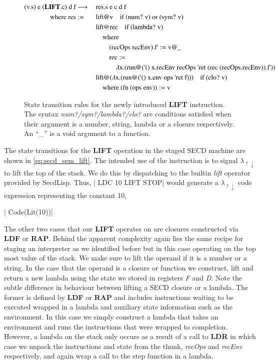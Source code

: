 \documentclass[a4paper,12pt,twoside,openright]{report}
\theoremstyle{definition}
\newcommand{\ts}{\textquotesingle}
\newcommand{\mslang}{$\lambda_{\uparrow\downarrow}$}
\newcommand{\secdlisp}{SecdLisp}
\begin{document}
\begin{figure}[htp!]
\centering
\begin{alignat}{3}
		\text{(v.s) e (} \mathbf{LIFT}\text{.c) d f} & \longrightarrow \: \label{eq:secd_sem_lift}
		 && \text{res.s e c d f}   \\
		 \text{where res} & := && \text{lift@v\quad if (num? v) or (sym? v)} \nonumber \\
		 & && \text{lift@rec} \quad \text{if (lambda? v)} \nonumber \\
		 & && \quad \text{where} \nonumber \\
		 & && \qquad \text{(recOps recEnv).f{\ts}}:= \text{v@\_} \nonumber \\
		 & && \qquad \text{rec} := \nonumber \\
		 & && \quad\qquad\text{$\lambda$x.(run@({\ts}() x.recEnv recOps {\ts}ret (rec (recOps.recEnv)).f{\ts}))} \nonumber \\
		 & && \text{lift@($\lambda$x.(run@({\ts}() x.env ops {\ts}ret f)))} \quad\text{if (clo? v)} \nonumber \\
		 & && \quad \text{where (fn (ops env))}:= \text{v} \nonumber
\end{alignat}
\caption{State transition rules for the newly introduced \textbf{LIFT} instruction. The syntax \textit{num?/sym?/lambda?/clo?} are conditions satisfied when their argument is a number, string, lambda or a closure respectively. An ``\_'' is a void argument to a function.}
\label{fig:secd_lift_sem}
\end{figure}

The state transitions for the \textbf{LIFT} operation in the staged SECD machine are shown in \eqref{eq:secd_sem_lift}. The intended use of the instruction is to signal \mslang{} to lift the top of the stack. We do this by dispatching to the builtin \textit{lift} operator provided by \secdlisp. Thus, |   LDC 10 LIFT STOP| would generate a \mslang{} code expression representing the constant 10,

|    Code(Lit(10))|

The other two cases that our \textbf{LIFT} operates on are closures constructed via \textbf{LDF} or \textbf{RAP}. Behind the apparent complexity again lies the same recipe for staging an interpreter as we identified before but in this case operating on the top most value of the stack. We make sure to lift the operand if it is a number or a string. In the case that the operand is a closure or function we construct, lift and return a new lambda using the state we stored in registers \textit{F} and \textit{D}. Note the subtle difference in behaviour between lifting a SECD closure or a lambda. The former is defined by \textbf{LDF} or \textbf{RAP} and includes instructions waiting to be executed wrapped in a lambda and auxiliary state information such as the environment. In this case we simply construct a lambda that takes an environment and runs the instructions that were wrapped to completion. However, a lambda on the stack only occurs as a result of a call to \textbf{LDR} in which case we unpack the instructions and state from the thunk, \textit{recOps} and \textit{recEnv} respectively, and again wrap a call to the step function in a lambda.
\end{document}
